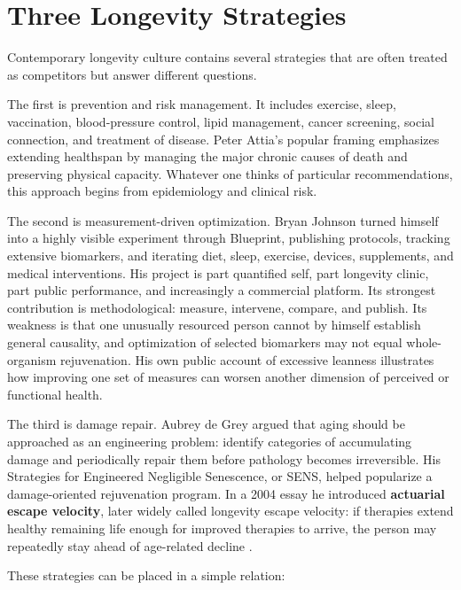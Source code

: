 \chapter{Three Longevity Strategies}\label{chapter-10-three-longevity-strategies}

Contemporary longevity culture contains several strategies that are often treated as competitors but answer different questions.

The first is prevention and risk management. It includes exercise, sleep, vaccination, blood-pressure control, lipid management, cancer screening, social connection, and treatment of disease. Peter Attia's popular framing emphasizes extending healthspan by managing the major chronic causes of death and preserving physical capacity. Whatever one thinks of particular recommendations, this approach begins from epidemiology and clinical risk.

The second is measurement-driven optimization. Bryan Johnson turned himself into a highly visible experiment through Blueprint, publishing protocols, tracking extensive biomarkers, and iterating diet, sleep, exercise, devices, supplements, and medical interventions. His project is part quantified self, part longevity clinic, part public performance, and increasingly a commercial platform. Its strongest contribution is methodological: measure, intervene, compare, and publish. Its weakness is that one unusually resourced person cannot by himself establish general causality, and optimization of selected biomarkers may not equal whole-organism rejuvenation. His own public account of excessive leanness illustrates how improving one set of measures can worsen another dimension of perceived or functional health.

The third is damage repair. Aubrey de Grey argued that aging should be approached as an engineering problem: identify categories of accumulating damage and periodically repair them before pathology becomes irreversible. His Strategies for Engineered Negligible Senescence, or SENS, helped popularize a damage-oriented rejuvenation program. In a 2004 essay he introduced \textbf{actuarial escape velocity}, later widely called longevity escape velocity: if therapies extend healthy remaining life enough for improved therapies to arrive, the person may repeatedly stay ahead of age-related decline \autocite{degrey2004escape}.

These strategies can be placed in a simple relation:

